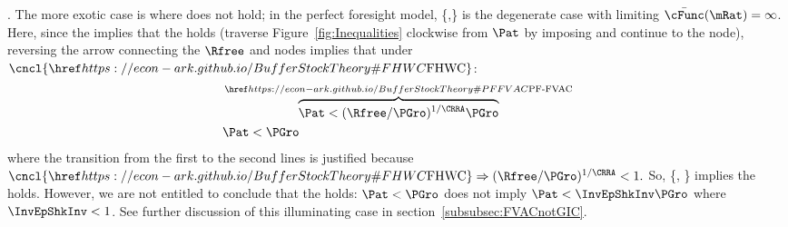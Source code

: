 \documentclass[BufferStockTheory]{subfiles}
\begin{document}
\begin{comment}
\begin{align}
  \Rfree^{1/\CRRA}\PGro^{1-1/\CRRA}\uInvEpShkuInv^{1-1/\CRRA} & < \Pat <   \Rfree^{1/\CRRA}\PGro^{1-1/\CRRA}
  \\   \uInvEpShkuInv^{1-1/\CRRA}(\Rfree/\PGro)^{1/\CRRA-1} & < \PatR < 1 < (\Rfree/\PGro)^{1/\CRRA-1}
  \\   \uInvEpShkuInv^{1-1/\CRRA}\Rfree^{1/\CRRA-1}\PGro^{1-1/\CRRA}                                                               & < \Rfree^{1/\CRRA}\DiscFac^{1/\CRRA}/\Rfree < 1 < \Rfree^{1/\CRRA-1}\PGro^{1-1/\CRRA}
  \\   \uInvEpShkuInv^{1-1/\CRRA}\Rfree^{-1}\PGro^{1-1/\CRRA}                                                               & < \DiscFac^{1/\CRRA}/\Rfree < \Rfree^{-1/\CRRA} < \Rfree^{-1}\PGro^{1-1/\CRRA}
  \\   \uInvEpShkuInv^{1-1/\CRRA}\PGro^{1-1/\CRRA}                                                               & < \DiscFac^{1/\CRRA} < \Rfree^{1-1/\CRRA} < \PGro^{1-1/\CRRA}
  \\   \uInvEpShkuInv^{(\CRRA-1)/\CRRA}\PGro^{(\CRRA-1)/\CRRA}                                                               & < \DiscFac^{1/\CRRA} < \Rfree^{(\CRRA-1)/\CRRA} < \PGro^{(\CRRA-1)/\CRRA}
  \\   \uInvEpShkuInv^{\CRRA-1} & < \DiscFac/\PGro < 1
  \\   \PGro \uInvEpShkuInv^{\CRRA-1} & < \DiscFac < \PGro
\end{align}
\end{comment}

\noindent \textbf{\cncl{\FHWC}}.  The more exotic case is where {\FHWC} does not hold; in the perfect foresight model, \{{\RIC},\cncl{\FHWC}\} is the degenerate case with limiting $\bar{\cFunc}(\mRat)=\infty$.  Here, since the {\FVAC} implies that the {\PFFVAC} holds (traverse Figure~\ref{fig:Inequalities} clockwise from $\Pat$ by imposing {\FVAC} and continue to the {\PFVAF} node), reversing the arrow connecting the $\Rfree$ and {\PFVAF} nodes implies that under $\cncl{\FHWC}$:
\begin{align*}
   & \overbrace{\Pat < (\Rfree/\PGro)^{1/\CRRA}\PGro}^{\PFFVAC}
      \\ & \Pat < \PGro
\end{align*}
where the transition from the first to the second lines is justified because $\cncl{\FHWC} \Rightarrow (\Rfree/\PGro)^{1/\CRRA}<1.$  So, \{\RIC, \cncl{\FHWC}\} implies the {\GICAbs} holds.  However, we are not entitled to conclude that the {\GICNrm} holds: $\Pat < \PGro$ does not imply $\Pat < \InvEpShkInv \PGro$ where $\InvEpShkInv<1$.  See further discussion of this illuminating case in section~\ref{subsubsec:FVACnotGIC}.
\end{document}

